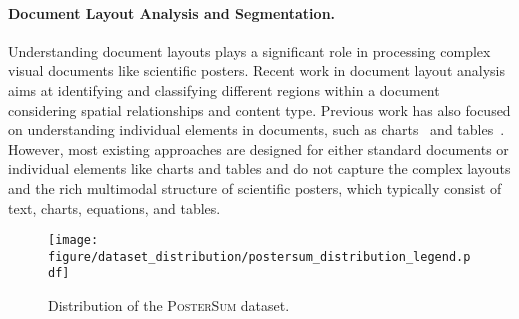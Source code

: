\paragraph{Document Layout Analysis and Segmentation.}
%
Understanding document layouts plays a significant role in processing complex visual documents like scientific posters.
%
Recent work in document layout analysis~\cite{ERNIE,DBLP:conf/acl/0005RSMBKPNL24,DBLP:conf/cvpr/LuoSZZYY24,DocFormerv2} aims at identifying and classifying different regions within a document considering spatial relationships and content type.
%
Previous work has also focused on understanding individual elements in documents, such as charts~\citep{masry-etal-2022-chartqa} and tables~\citep{zheng-etal-2024-multimodal}.
% 
However, most existing approaches are designed for either standard documents or individual elements like charts and tables and do not capture the complex layouts and the rich multimodal structure of scientific posters, which typically consist of text, charts, equations, and tables.
%

\begin{figure}[t]
  \centering
  \vspace{-2ex}
\texttt{[image: figure/dataset\_distribution/postersum\_distribution\_legend.pdf]}
\vspace{-2ex}
  \caption{Distribution of the \textsc{PosterSum} dataset.}
  \label{fig:year_dist}
\end{figure}
%